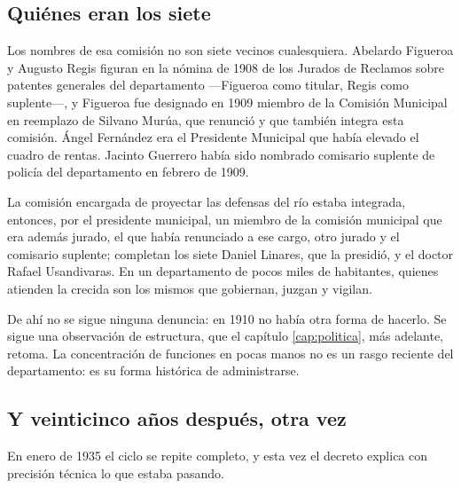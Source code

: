 \subsection*{Quiénes eran los siete}

Los nombres de esa comisión no son siete vecinos cualesquiera. Abelardo Figueroa y Augusto
Regis figuran en la nómina de 1908 de los Jurados de Reclamos sobre patentes generales del departamento —Figueroa como titular,
Regis como suplente—, y Figueroa fue designado en 1909 miembro de la Comisión Municipal en
reemplazo de Silvano Murúa, que renunció y que también integra esta comisión. Ángel
Fernández era el Presidente Municipal que había elevado el cuadro de rentas. Jacinto
Guerrero había sido nombrado comisario suplente de policía del departamento en febrero de
1909.

La comisión encargada de proyectar las defensas del río estaba integrada, entonces, por el
presidente municipal, un miembro de la comisión municipal que era además jurado, el que había
renunciado a ese cargo, otro jurado y el comisario suplente; completan los siete Daniel
Linares, que la presidió, y el doctor Rafael Usandivaras. En un departamento de pocos miles de habitantes, quienes atienden la crecida son los mismos que gobiernan, juzgan y vigilan.

De ahí no se sigue ninguna denuncia: en 1910 no había otra forma de hacerlo. Se sigue una
observación de estructura, que el capítulo \ref{cap:politica}, más adelante, retoma. La concentración de funciones en
pocas manos no es un rasgo reciente del departamento: es su forma histórica de
administrarse.

\subsection*{Y veinticinco años después, otra vez}

En enero de 1935 el ciclo se repite completo, y esta vez el decreto explica con precisión
técnica lo que estaba pasando.

